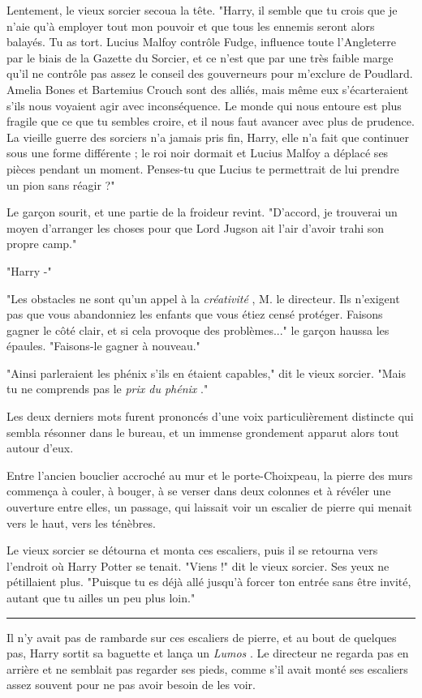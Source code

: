 Lentement, le vieux sorcier secoua la tête. "Harry, il semble que tu crois que je n'aie qu'à employer tout mon pouvoir et que tous les ennemis seront alors balayés. Tu as tort. Lucius Malfoy contrôle Fudge, influence toute l'Angleterre par le biais de la Gazette du Sorcier, et ce n'est que par une très faible marge qu'il ne contrôle pas assez le conseil des gouverneurs pour m'exclure de Poudlard. Amelia Bones et Bartemius Crouch sont des alliés, mais même eux s'écarteraient s'ils nous voyaient agir avec inconséquence. Le monde qui nous entoure est plus fragile que ce que tu sembles croire, et il nous faut avancer avec plus de prudence. La vieille guerre des sorciers n'a jamais pris fin, Harry, elle n'a fait que continuer sous une forme différente ; le roi noir dormait et Lucius Malfoy a déplacé ses pièces pendant un moment. Penses-tu que Lucius te permettrait de lui prendre un pion sans réagir ?"

Le garçon sourit, et une partie de la froideur revint. "D'accord, je trouverai un moyen d'arranger les choses pour que Lord Jugson ait l'air d'avoir trahi son propre camp."

"Harry -"

"Les obstacles ne sont qu'un appel à la \emph{créativité} , M. le directeur. Ils n'exigent pas que vous abandonniez les enfants que vous étiez censé protéger. Faisons gagner le côté clair, et si cela provoque des problèmes..." le garçon haussa les épaules. "Faisons-le gagner à nouveau."

"Ainsi parleraient les phénix s'ils en étaient capables," dit le vieux sorcier. "Mais tu ne comprends pas le \emph{prix du phénix} ."

Les deux derniers mots furent prononcés d'une voix particulièrement distincte qui sembla résonner dans le bureau, et un immense grondement apparut alors tout autour d'eux.

Entre l'ancien bouclier accroché au mur et le porte-Choixpeau, la pierre des murs commença à couler, à bouger, à se verser dans deux colonnes et à révéler une ouverture entre elles, un passage, qui laissait voir un escalier de pierre qui menait vers le haut, vers les ténèbres.

Le vieux sorcier se détourna et monta ces escaliers, puis il se retourna vers l'endroit où Harry Potter se tenait. "Viens !" dit le vieux sorcier. Ses yeux ne pétillaient plus. "Puisque tu es déjà allé jusqu'à forcer ton entrée sans être invité, autant que tu ailles un peu plus loin."
\par\noindent\rule{\textwidth}{0.4pt}
Il n'y avait pas de rambarde sur ces escaliers de pierre, et au bout de quelques pas, Harry sortit sa baguette et lança un \emph{Lumos} . Le directeur ne regarda pas en arrière et ne semblait pas regarder ses pieds, comme s'il avait monté ses escaliers assez souvent pour ne pas avoir besoin de les voir.

